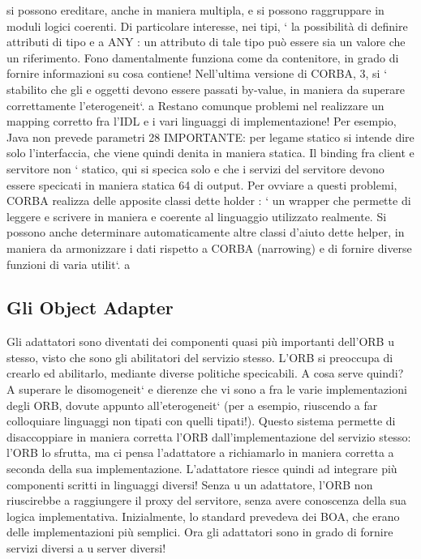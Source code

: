 \documentclass[a4paper,12pt]{article}
\begin{document}
si possono ereditare, anche in maniera multipla, e si possono raggruppare in
moduli logici coerenti.
Di particolare interesse, nei tipi, ` la possibilità di definire attributi di tipo
e
a
ANY : un attributo di tale tipo può essere sia un valore che un riferimento. Fono
damentalmente funziona come da contenitore, in grado di fornire informazioni
su cosa contiene! Nell'ultima versione di CORBA, 3, si ` stabilito che gli
e
oggetti devono essere passati by-value, in maniera da superare correttamente
l'eterogeneit`.
a
Restano comunque problemi nel realizzare un mapping corretto fra l'IDL e
i vari linguaggi di implementazione! Per esempio, Java non prevede parametri
28 IMPORTANTE: per legame statico si intende dire solo l'interfaccia, che viene quindi
denita in maniera statica. Il binding fra client e servitore non ` statico, qui si specica solo
e
che i servizi del servitore devono essere specicati in maniera statica
64
di output. Per ovviare a questi problemi, CORBA realizza delle apposite classi dette holder : ` un wrapper che permette
di leggere e scrivere in maniera
e
coerente al linguaggio utilizzato realmente. Si possono anche determinare automaticamente altre classi d'aiuto dette
helper, in maniera da armonizzare i dati
rispetto a CORBA (narrowing) e di fornire diverse funzioni di varia utilit`.
a
\subsection{Gli Object Adapter}
Gli adattatori sono diventati dei componenti quasi più importanti dell'ORB
u
stesso, visto che sono gli abilitatori del servizio stesso. L'ORB si preoccupa di
crearlo ed abilitarlo, mediante diverse politiche specicabili.
A cosa serve quindi? A superare le disomogeneit` e dierenze che vi sono
a
fra le varie implementazioni degli ORB, dovute appunto all'eterogeneit` (per
a
esempio, riuscendo a far colloquiare linguaggi non tipati con quelli tipati!).
Questo sistema permette di disaccoppiare in maniera corretta l'ORB dall'implementazione del servizio stesso: l'ORB lo
sfrutta, ma ci pensa l'adattatore a
richiamarlo in maniera corretta a seconda della sua implementazione. L'adattatore riesce quindi ad integrare più
componenti scritti in linguaggi diversi! Senza
u
un adattatore, l'ORB non riuscirebbe a raggiungere il proxy del servitore, senza
avere conoscenza della sua logica implementativa.
Inizialmente, lo standard prevedeva dei BOA, che erano delle implementazioni più semplici. Ora gli adattatori sono in
grado di fornire servizi diversi a
u
server diversi!
\end{document}
